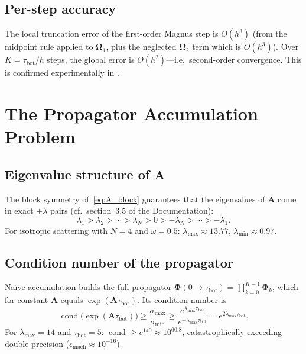\documentclass[11pt,a4paper]{article}
\newcommand{\cond}{\operatorname{cond}}
\newcommand{\mat}[1]{\mathbf{#1}}
\newcommand{\tbot}{\tau_{\mathrm{bot}}}
\theoremstyle{definition}
\begin{document}
\subsection{Per-step accuracy}

The local truncation error of the first-order Magnus step is $O(h^3)$
(from the midpoint rule applied to $\mat{\Omega}_1$, plus the neglected
$\mat{\Omega}_2$ term which is $O(h^3)$).  Over $K=\tbot/h$ steps,
the global error is $O(h^2)$---i.e.\ second-order convergence.
This is confirmed experimentally in .


\section{The Propagator Accumulation Problem}\label{sec:propagator_problem}

\subsection{Eigenvalue structure of $\mat{A}$}

The block symmetry of~\eqref{eq:A_block} guarantees that the
eigenvalues of $\mat{A}$ come in exact $\pm\lambda$ pairs
(cf.\ section~3.5 of the Documentation):
\begin{equation}
  \lambda_1 > \lambda_2 > \cdots > \lambda_N > 0
  > -\lambda_N > \cdots > -\lambda_1.
\end{equation}
For isotropic scattering with $N\!=\!4$ and $\omega=0.5$:
$\lambda_{\max}\approx 13.77$, $\lambda_{\min}\approx 0.97$.

\subsection{Condition number of the propagator}

Na\"ive accumulation builds the full propagator
$\mat{\Phi}(0\to\tbot)=\prod_{k=0}^{K-1}\mat{\Phi}_k$, which for
constant $\mat{A}$ equals $\exp(\mat{A}\tbot)$.  Its condition number is
\begin{equation}\label{eq:cond_propagator}
  \cond\bigl(\exp(\mat{A}\tbot)\bigr)
  \geq \frac{\sigma_{\max}}{\sigma_{\min}}
  \geq \frac{e^{\lambda_{\max}\tbot}}{e^{-\lambda_{\max}\tbot}}
  = e^{2\lambda_{\max}\tbot}.
\end{equation}
For $\lambda_{\max}=14$ and $\tbot=5$:
$\cond\geq e^{140}\approx 10^{60.8}$, catastrophically exceeding
double precision ($\epsilon_{\text{mach}}\approx 10^{-16}$).
\end{document}
